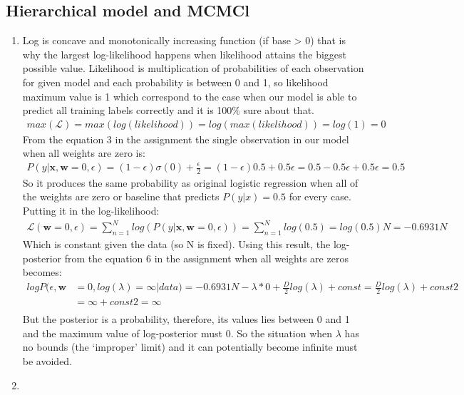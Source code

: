\documentclass{article}
\newcommand{\vect}[1]{\boldsymbol{#1}} %
\begin{document}
				\subsection{Hierarchical model and MCMCl}
					\begin{enumerate}[label=(\alph*)]
						\item 
							Log is concave and monotonically increasing function (if base > 0) that is why the largest log-likelihood happens when likelihood attains the biggest possible value. Likelihood is multiplication of probabilities of each observation for given model and each probability is between 0 and 1, so likelihood maximum value is 1 which correspond to the case when our model is able to predict all training labels correctly and it is 100\% sure about that.  
							\begin{align*}
							max(\mathcal{L})=max(log(likelihood)) = log(max(likelihood))=log(1)=0
							\end{align*}
							From the equation 3 in the assignment the single observation in our model  when all weights are zero is:
							\begin{align*}
							P(y| \vect{x}, \vect{w}=0, \epsilon) = (1 - \epsilon) \sigma(0) + \frac{\epsilon}{2}=(1-\epsilon)0.5 + 0.5\epsilon = 0.5 - 0.5\epsilon + 0.5\epsilon = 0.5
							\end{align*}
							So it produces the same probability as original logistic regression when all of the weights are zero or baseline that predicts $P(y | x) =0.5$ for every case. Putting it in the log-likelihood:
							\begin{align*}
							\mathcal{L}(\vect{w}=0, \epsilon)=\sum_{n=1}^{N}log(P(y| \vect{x}, \vect{w}=0, \epsilon))=\sum_{n=1}^{N}log(0.5)=log(0.5)N = -0.6931N
							\end{align*}
							Which is constant given the data (so N is fixed).
							Using this result, the log-posterior from the equation 6 in the assignment when all weights are zeros becomes:
							\begin{align*}
							logP(\epsilon, \vect{w} &=0, log( \lambda)=\infty | data) = -0.6931N - \lambda * 0 + \frac{D}{2}log(\lambda) + const =  \frac{D}{2}log(\lambda) + const2 \\
							&= \infty + const2 = \infty \\
							\end{align*}
							But the posterior is a probability, therefore, its values lies between 0 and 1 and the maximum value of log-posterior must 0. So the situation when $\lambda$ has no bounds (the ‘improper’ limit) and it can potentially become infinite must be avoided.
						\item 
						

\end{enumerate}
\end{document}
